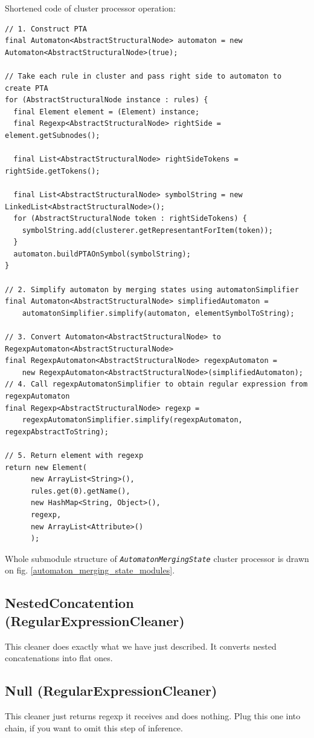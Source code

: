 \documentclass[a4paper,10pt,oneside]{article}
\newcommand{\jmodule}[1]{\texttt{\textit{#1}}}
\begin{document}
Shortened code of cluster processor operation:
\begin{verbatim}
// 1. Construct PTA
final Automaton<AbstractStructuralNode> automaton = new Automaton<AbstractStructuralNode>(true);

// Take each rule in cluster and pass right side to automaton to create PTA
for (AbstractStructuralNode instance : rules) {
  final Element element = (Element) instance;
  final Regexp<AbstractStructuralNode> rightSide = element.getSubnodes();

  final List<AbstractStructuralNode> rightSideTokens = rightSide.getTokens();

  final List<AbstractStructuralNode> symbolString = new LinkedList<AbstractStructuralNode>();
  for (AbstractStructuralNode token : rightSideTokens) {
    symbolString.add(clusterer.getRepresentantForItem(token));
  }
  automaton.buildPTAOnSymbol(symbolString);
}

// 2. Simplify automaton by merging states using automatonSimplifier
final Automaton<AbstractStructuralNode> simplifiedAutomaton =
    automatonSimplifier.simplify(automaton, elementSymbolToString);

// 3. Convert Automaton<AbstractStructuralNode> to RegexpAutomaton<AbstractStructuralNode>
final RegexpAutomaton<AbstractStructuralNode> regexpAutomaton =
    new RegexpAutomaton<AbstractStructuralNode>(simplifiedAutomaton);
// 4. Call regexpAutomatonSimplifier to obtain regular expression from regexpAutomaton
final Regexp<AbstractStructuralNode> regexp =
    regexpAutomatonSimplifier.simplify(regexpAutomaton, regexpAbstractToString);

// 5. Return element with regexp
return new Element(
      new ArrayList<String>(),
      rules.get(0).getName(),
      new HashMap<String, Object>(),
      regexp,
      new ArrayList<Attribute>()
      );
\end{verbatim}
Whole submodule structure of \jmodule{AutomatonMergingState} cluster processor is drawn on fig. \ref{automaton_merging_state_modules}.

\subsection{NestedConcatention (RegularExpressionCleaner)}
This cleaner does exactly what we have just described.
It converts nested concatenations into flat ones.

\subsection{Null (RegularExpressionCleaner)}
This cleaner just returns regexp it receives and does nothing.
Plug this one into chain, if you want to omit this step of inference.
\end{document}
